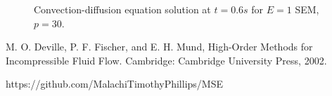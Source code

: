 \documentclass[final,t]{beamer}
\begin{document}
\begin{frame}[fragile]{}
\begin{columns}[t]
\begin{column}{.45\linewidth}
\begin{tcolorbox}[toplevelbox,adjusted title=Results]
\begin{figure}
\caption{\label{fig:convdiffplot} Convection-diffusion equation solution at $t=0.6 s$ for $E=1$ SEM, $p=30$.}
      \end{figure}
      
      \end{tcolorbox}

      \begin{tcolorbox}[toplevelbox,adjusted title=References]
      M. O. Deville, P. F. Fischer, and E. H. Mund, High-Order Methods for Incompressible Fluid Flow. Cambridge: Cambridge University Press, 2002.
      \end{tcolorbox}
      \begin{tcolorbox}[toplevelbox,adjusted title=GitHub]
      https://github.com/MalachiTimothyPhillips/MSE
      \end{tcolorbox}

    \end{column}


  \end{columns}
\end{frame}
\end{document}
